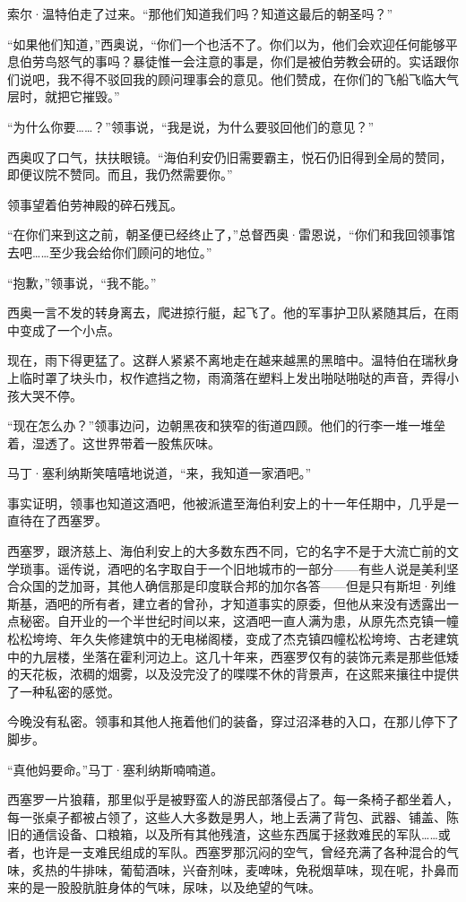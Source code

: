 \documentclass[AutoFakeBold=true]{book}
\begin{document}
索尔·温特伯走了过来。``那他们知道我们吗？知道这最后的朝圣吗？''

``如果他们知道，''西奥说，``你们一个也活不了。你们以为，他们会欢迎任何能够平息伯劳鸟怒气的事吗？暴徒惟一会注意的事是，你们是被伯劳教会研的。实话跟你们说吧，我不得不驳回我的顾问理事会的意见。他们赞成，在你们的飞船飞临大气层时，就把它摧毁。''

``为什么你要……？''领事说，``我是说，为什么要驳回他们的意见？''

西奥叹了口气，扶扶眼镜。``海伯利安仍旧需要霸主，悦石仍旧得到全局的赞同，即便议院不赞同。而且，我仍然需要你。''

领事望着伯劳神殿的碎石残瓦。

``在你们来到这之前，朝圣便已经终止了，''总督西奥·雷恩说，``你们和我回领事馆去吧……至少我会给你们顾问的地位。''

``抱歉，''领事说，``我不能。''

西奥一言不发的转身离去，爬进掠行艇，起飞了。他的军事护卫队紧随其后，在雨中变成了一个小点。

现在，雨下得更猛了。这群人紧紧不离地走在越来越黑的黑暗中。温特伯在瑞秋身上临时罩了块头巾，权作遮挡之物，雨滴落在塑料上发出啪哒啪哒的声音，弄得小孩大哭不停。

``现在怎么办？''领事边问，边朝黑夜和狭窄的街道四顾。他们的行李一堆一堆垒着，湿透了。这世界带着一股焦灰味。

马丁·塞利纳斯笑嘻嘻地说道，``来，我知道一家酒吧。''

\vspace*{1em}

事实证明，领事也知道这酒吧，他被派遣至海伯利安上的十一年任期中，几乎是一直待在了西塞罗。

西塞罗，跟济慈上、海伯利安上的大多数东西不同，它的名字不是于大流亡前的文学琐事。谣传说，酒吧的名字取自于一个旧地城市的一部分——有些人说是美利坚合众国的芝加哥，其他人确信那是印度联合邦的加尔各答——但是只有斯坦·列维斯基，酒吧的所有者，建立者的曾孙，才知道事实的原委，但他从来没有透露出一点秘密。自开业的一个半世纪时间以来，这酒吧一直人满为患，从原先杰克镇一幢松松垮垮、年久失修建筑中的无电梯阁楼，变成了杰克镇四幢松松垮垮、古老建筑中的九层楼，坐落在霍利河边上。这几十年来，西塞罗仅有的装饰元素是那些低矮的天花板，浓稠的烟雾，以及没完没了的喋喋不休的背景声，在这熙来攘往中提供了一种私密的感觉。

今晚没有私密。领事和其他人拖着他们的装备，穿过沼泽巷的入口，在那儿停下了脚步。

``真他妈要命。''马丁·塞利纳斯喃喃道。

西塞罗一片狼藉，那里似乎是被野蛮人的游民部落侵占了。每一条椅子都坐着人，每一张桌子都被占领了，这些人大多数是男人，地上丢满了背包、武器、铺盖、陈旧的通信设备、口粮箱，以及所有其他残渣，这些东西属于拯救难民的军队……或者，也许是一支难民组成的军队。西塞罗那沉闷的空气，曾经充满了各种混合的气味，炙热的牛排味，葡萄酒味，兴奋剂味，麦啤味，免税烟草味，现在呢，扑鼻而来的是一股股肮脏身体的气味，尿味，以及绝望的气味。
\end{document}
